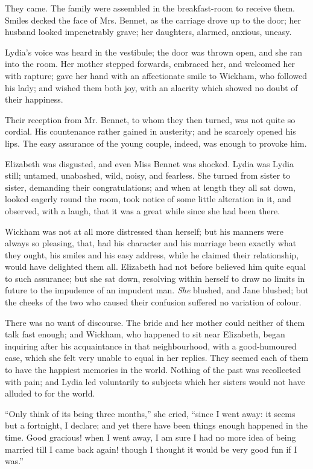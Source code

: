 \documentclass[12pt,openright]{book}
\begin{document}
They came. The family were assembled in the breakfast-room to receive them. Smiles decked the face of Mrs. Bennet, as the carriage drove up to the door; her husband looked impenetrably grave; her daughters, alarmed, anxious, uneasy.

Lydia’s voice was heard in the vestibule; the door was thrown open, and she ran into the room. Her mother stepped forwards, embraced her, and welcomed her with rapture; gave her hand with an affectionate smile to Wickham, who followed his lady; and wished them both joy, with an alacrity which showed no doubt of their happiness.

Their reception from Mr. Bennet, to whom they then turned, was not quite so cordial. His countenance rather gained in austerity; and he scarcely opened his lips. The easy assurance of the young couple, indeed, was enough to provoke him.

Elizabeth was disgusted, and even Miss Bennet was shocked. Lydia was Lydia still; untamed, unabashed, wild, noisy, and fearless. She turned from sister to sister, demanding their congratulations; and when at length they all sat down, looked eagerly round the room, took notice of some little alteration in it, and observed, with a laugh, that it was a great while since she had been there.

Wickham was not at all more distressed than herself; but his manners were always so pleasing, that, had his character and his marriage been exactly what they ought, his smiles and his easy address, while he claimed their relationship, would have delighted them all. Elizabeth had not before believed him quite equal to such assurance; but she sat down, resolving within herself to draw no limits in future to the impudence of an impudent man. \textit{She} blushed, and Jane blushed; but the cheeks of the two who caused their confusion suffered no variation of colour.

There was no want of discourse. The bride and her mother could neither of them talk fast enough; and Wickham, who happened to sit near Elizabeth, began inquiring after his acquaintance in that neighbourhood, with a good-humoured ease, which she felt very unable to equal in her replies. They seemed each of them to have the happiest memories in the world. Nothing of the past was recollected with pain; and Lydia led voluntarily to subjects which her sisters would not have alluded to for the world.

“Only think of its being three months,” she cried, “since I went away: it seems but a fortnight, I declare; and yet there have been things enough happened in the time. Good gracious! when I went away, I am sure I had no more idea of being married till I came back again! though I thought it would be very good fun if I was.”
\end{document}
